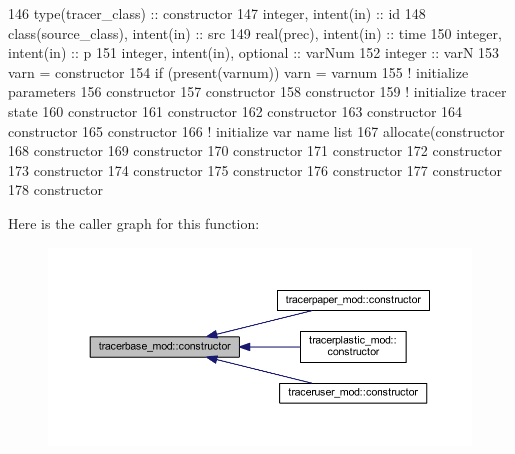 \begin{DoxyCode}
146     \textcolor{keywordtype}{type}(tracer\_class) :: constructor
147     \textcolor{keywordtype}{integer}, \textcolor{keywordtype}{intent(in)} :: id
148     \textcolor{keywordtype}{class}(source\_class), \textcolor{keywordtype}{intent(in)} :: src
149     \textcolor{keywordtype}{real(prec)}, \textcolor{keywordtype}{intent(in)} :: time
150     \textcolor{keywordtype}{integer}, \textcolor{keywordtype}{intent(in)} :: p
151     \textcolor{keywordtype}{integer}, \textcolor{keywordtype}{intent(in)}, \textcolor{keywordtype}{optional} :: varNum
152     \textcolor{keywordtype}{integer} :: varN
153     varn = constructor%
154     \textcolor{keywordflow}{if} (\textcolor{keyword}{present}(varnum)) varn = varnum
155     \textcolor{comment}{! initialize parameters}
156     constructor%
157     constructor%
158     constructor%
159     \textcolor{comment}{! initialize tracer state}
160     constructor%
161     constructor%
162     constructor%
163     constructor%
164     constructor%
165     constructor%
166     \textcolor{comment}{! initialize var name list}
167     \textcolor{keyword}{allocate}(constructor%
168     constructor%
169     constructor%
170     constructor%
171     constructor%
172     constructor%
173     constructor%
174     constructor%
175     constructor%
176     constructor%
177     constructor%
178     constructor%
\end{DoxyCode}
Here is the caller graph for this function\+:\nopagebreak
\begin{figure}[H]
\begin{center}
\leavevmode
\includegraphics[width=350pt]{namespacetracerbase__mod_acf861b7ca360dcad1331ca85c50853a6_icgraph}
\end{center}
\end{figure}
\mbox{\label{namespacetracerbase__mod_a0be55b393be0846cbbe6be9feb3bb539}} 
